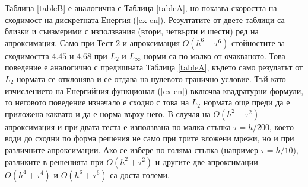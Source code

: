 \documentclass{article}
\newcommand{\rf}[1]{(\ref{#1})}
\begin{document}
Таблица \ref{tableB} е аналогична с Таблица \ref{tableA}, но показва скоростта на сходимост на дискретната Енергия \rf{ex-en}. Резултатите от двете таблици са близки и съизмерими с използвания (втори, четвърти и шести) ред на апроксимация. Само при  Тест 2 и апроксимация $O(h^6 + \tau^6)$ стойностите за сходимостта $4.45$ и $4.68$ при $L_2$ и $L_{\infty}$ норми са по-малко от очакваното. Това поведение е аналогично с предишната Таблица \ref{tableA}, където само резулатът от $L_2$ нормата се отклонява и се отдава на нулевото гранично условие. Тъй като изчислението на Енергийния функционал \rf{ex-en} включва квадратурни формули, то неговото поведение изначало е сходно с това на $L_2$ нормата още преди да е приложена каквато и да е норма върху него. В случая на $O(h^2 + \tau^2)$  апроксимация и при двата теста е използвана по-малка стъпка $\tau = h/200$, което води до сходни по форма решения не само при трите вложени мрежи, но и при различните апроксимации. Ако се избере по-голяма стъпка (например $\tau = h/10$), разликите в решенията при $O(h^2 + \tau^2)$ и другите две апроксимации $O(h^4 + \tau^4)$ и $O(h^6 + \tau^6)$ са доста големи.

\end{document}
